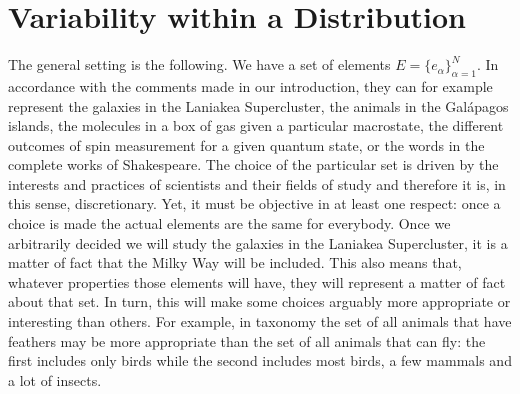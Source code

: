 \documentclass{article}
\begin{document}


\section{Variability within a Distribution\label{vwd}}

The general setting is the following. We have a set of elements $E = \{e_\alpha\}_{\alpha=1}^N$. In accordance with the comments made in our introduction, they can for example represent the galaxies in the Laniakea Supercluster, the animals in the Gal\'{a}pagos islands, the molecules in a box of gas given a particular macrostate, the different outcomes of spin measurement for a given quantum state, or the words in the complete works of Shakespeare. The choice of the particular set is driven by the interests and practices of scientists and their fields of study and therefore it is, in this sense, discretionary. Yet, it must be objective in at least one respect: once a choice is made the actual elements are the same for everybody. Once we arbitrarily decided we will study the galaxies in the Laniakea Supercluster, it is a matter of fact that the Milky Way will be included. This also means that, whatever properties those elements will have, they will represent a matter of fact about that set. In turn, this will make some choices arguably more appropriate or interesting than others. For example, in taxonomy the set of all animals that have feathers may be more appropriate than the set of all animals that can fly: the first includes only birds while the second includes most birds, a few mammals and a lot of insects.
\end{document}
